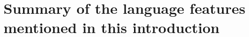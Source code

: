 \documentclass[11pt,a4paper]{article}
\begin{document}









\section{Summary of the language features mentioned in this introduction}

\newpage


\end{document}
